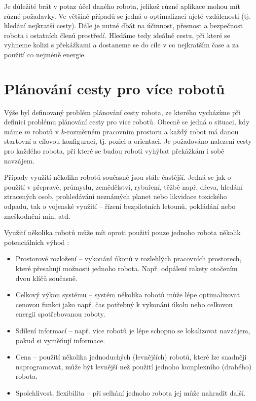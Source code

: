Je důležité brát v potaz účel daného robota, jelikož různé aplikace mohou mít různé požadavky. Ve většině případů se jedná o optimalizaci ujeté vzdálenosti (tj. hledání nejkratší cesty). Dále je nutné dbát na účinnost, přesnost a bezpečnost robota i ostatních členů prostředí. Hledáme tedy ideálně cestu, při které se vyhneme kolizi s překážkami a dostaneme se do cíle v co nejkratším čase a za použití co nejméně energie. \cite{Koubaa20180406}



\section{Plánování cesty pro více robotů}\label{sec:multirobotPathPlanning}
Výše byl definovaný problém plánování cesty robota, ze kterého vycházíme při definici problému plánování cesty pro více robotů. Obecně se jedná o situaci, kdy máme $m$ robotů v $k$-rozměrném pracovním prostoru a každý robot má danou startovní a cílovou konfiguraci, tj. pozici a orientaci. Je požadováno nalezení cesty pro každého robota, při které se budou roboti vyhýbat překážkám i sobě navzájem. \cite{Yu20140122}

Případy využití několika robotů současně jsou stále častější. Jedná se jak o použití v přepravě, průmyslu, zemědělství, rybaření, těžbě např. dřeva, hledání ztracených osob, prohledávání neznámých planet nebo likvidace toxického odpadu, tak o vojenské využití -- řízení bezpilotních letounů, pokládání nebo zneškodnění min, atd. \cite{Dudek1996}

Využití několika robotů může mít oproti použití pouze jednoho robota několik potenciálních výhod \cite{Dudek1996,Yan20130104}:
\begin{itemize}
	\item Prostorové rozložení -- vykonání úkonů v rozlehlých pracovních prostorech, které přesahují možnosti jednoho robota. Např. odpálení rakety otočením dvou klíčů současně.
	\item Celkový výkon systému -- systém několika robotů může lépe optimalizovat cenovou funkci jako např. čas potřebný k vykonání úkolu nebo celkovou energii spotřebovanou roboty.
	\item Sdílení informací -- např. více robotů je lépe schopno se lokalizovat navzájem, pokud si vyměňují informace.
	\item Cena -- použití několika jednoduchých (levnějších) robotů, které lze snadněji naprogramovat, může být levnější než použití jednoho komplexního (drahého) robota.
	\item Spolehlivost, flexibilita -- při selhání jednoho robota jej může nahradit další.
\end{itemize}


